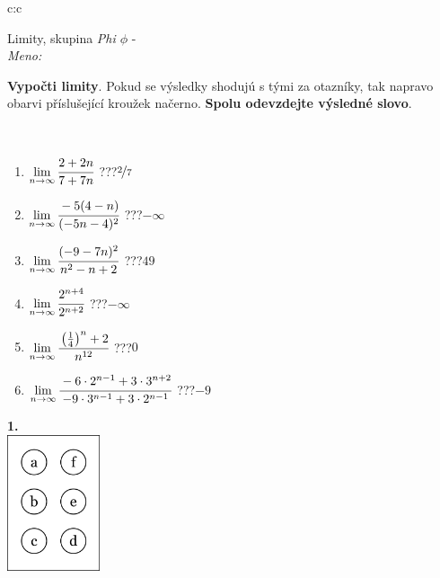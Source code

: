 \documentclass[10pt]{report}
\begin{document}
\begin{tabular}{c:c}
\begin{minipage}[c][104.5mm][t]{0.5\linewidth}
\begin{center}
\vspace{7mm}
{\huge Limity, skupina \textit{Phi $\phi$} -}\\[5mm]
\textit{Meno:}\phantom{xxxxxxxxxxxxxxxxxxxxxxxxxxxxxxxxxxxxxxxxxxxxxxxxxxxxxxxxxxxxxxxxx}\\[5mm]
\begin{minipage}{0.95\linewidth}
\begin{center}
\textbf{Vypočti limity}. Pokud se výsledky shodujú s tými za otazníky, tak napravo\\obarvi příslušející kroužek načerno. \textbf{Spolu odevzdejte výsledné slovo}.
\end{center}
\end{minipage}
\\[1mm]
\begin{minipage}{0.79\linewidth}
\begin{center}
\begin{varwidth}{\linewidth}
\begin{enumerate}
\normalsize
\item $\lim\limits_{n\to\infty}\cfrac{2+2n}{7+7n}$\quad \dotfill\; ???\;\dotfill \quad $\nicefrac{2}{7}$
\item $\lim\limits_{n\to\infty}\cfrac{-5(4-n)}{(-5n-4)^2}$\quad \dotfill\; ???\;\dotfill \quad $-\infty$
\item $\lim\limits_{n\to\infty}\cfrac{(-9-7n)^2}{n^2-n+2}$\quad \dotfill\; ???\;\dotfill \quad $49$
\item $\lim\limits_{n\to\infty}\cfrac{2^{n+4}}{2^{n+2}}$\quad \dotfill\; ???\;\dotfill \quad $-\infty$
\item $\lim\limits_{n\to\infty}\cfrac{\left(\frac{1}{4}\right)^n +2}{n^{12}}$\quad \dotfill\; ???\;\dotfill \quad $0$
\item $\lim\limits_{n\to\infty}\cfrac{-6\cdot 2^{n-1}+3\cdot 3^{n+2}}{-9\cdot 3^{n-1}+3\cdot 2^{n-1}}$\quad \dotfill\; ???\;\dotfill \quad $-9$
\end{enumerate}
\end{varwidth}
\end{center}
\end{minipage}
\begin{minipage}{0.20\linewidth}
\begin{center}
{\Huge\bfseries 1.} \\[2mm]
\includegraphics[height=40mm]{../images/braille.png}

\end{center}
\end{minipage}
\end{center}
\end{minipage}
\end{tabular}
\end{document}
